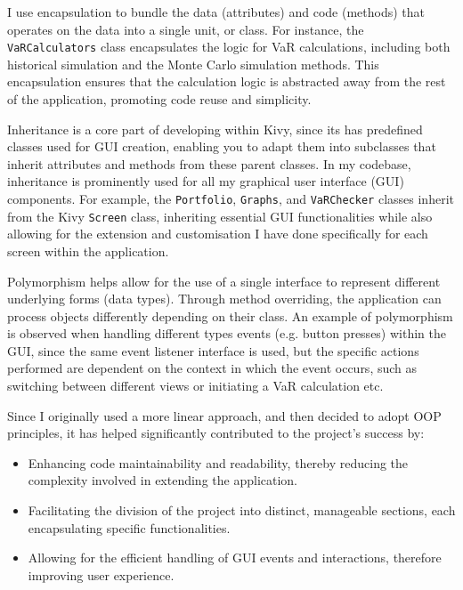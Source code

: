 \documentclass{article}
\begin{document}
I use encapsulation to bundle the data (attributes) and code (methods) that operates on the data into a single unit, or class. For instance, the \texttt{VaRCalculators} class encapsulates the logic for VaR calculations, including both historical simulation and the Monte Carlo simulation methods. This encapsulation ensures that the calculation logic is abstracted away from the rest of the application, promoting code reuse and simplicity.\\\vspace{0.3cm}

Inheritance is a core part of developing within Kivy, since its has predefined classes used for GUI creation, enabling you to adapt them into subclasses that inherit attributes and methods from these parent classes. In my codebase, inheritance is prominently used for all my graphical user interface (GUI) components. For example, the \texttt{Portfolio}, \texttt{Graphs}, and \texttt{VaRChecker} classes inherit from the Kivy \texttt{Screen} class, inheriting essential GUI functionalities while also allowing for the extension and customisation I have done specifically for each screen within the application.\\\vspace{0.3cm}

Polymorphism helps allow for the use of a single interface to represent different underlying forms (data types). Through method overriding, the application can process objects differently depending on their class. An example of polymorphism is observed when handling different types events (e.g. button presses) within the GUI, since the same event listener interface is used, but the specific actions performed are dependent on the context in which the event occurs, such as switching between different views or initiating a VaR calculation etc.\\\vspace{0.3cm}

Since I originally used a more linear approach, and then decided to adopt OOP principles, it has helped significantly contributed to the project's success by:
\begin{itemize}
    \item Enhancing code maintainability and readability, thereby reducing the complexity involved in extending the application.
    \item Facilitating the division of the project into distinct, manageable sections, each encapsulating specific functionalities.
    \item Allowing for the efficient handling of GUI events and interactions, therefore improving user experience.
\end{itemize}
\end{document}

